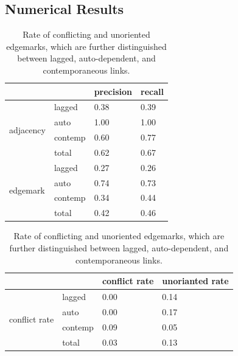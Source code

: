 \documentclass[conference]{IEEEtran}
\begin{document}
\subsection{Numerical Results}
\begin{table}[!htb]
    \caption{Numerical results}
    \begin{minipage}{.5\linewidth}
        \caption[]{precision and recall of edgemarks and adjacencies, which are further distinguished between lagged, auto-dependent, and contemporaneous links.}
      \centering
        \begin{tabular}{@{}llll@{}}
            \toprule
            \textbf{}                  &         & precision      & recall  \\ \midrule
            \multirow{4}{*}{adjacency} & lagged  & 0.38             & 0.39       \\
                                       & auto    & 1.00             & 1.00       \\
                                       & contemp & 0.60             & 0.77       \\
                                       & total   & 0.62             & 0.67       \\ \midrule
            \multirow{4}{*}{edgemark}  & lagged  & 0.27             & 0.26        \\
                                       & auto    & 0.74             & 0.73       \\
                                       & contemp & 0.34             & 0.44       \\
                                       & total   & 0.42             & 0.46       \\ \bottomrule
            \end{tabular}
            \label{tab:precision_recall}
    \end{minipage}%
    \begin{minipage}{.5\linewidth}
      \centering
            \caption[]{Rate of conflicting and unoriented edgemarks, which are further distinguished between lagged, auto-dependent, and contemporaneous links.}
            \begin{tabular}{@{}llll@{}}
            \toprule
            \textbf{}                        &         & conflict rate    & unorianted rate  \\ \midrule
            \multirow{4}{*}{conflict rate}   & lagged  & 0.00               & 0.14                \\
                                             & auto    & 0.00               & 0.17                \\
                                             & contemp & 0.09               & 0.05                \\
                                             & total   & 0.03               & 0.13       \\ \bottomrule
            \end{tabular}
            \label{tab:conflict_unoriented}
    \end{minipage} 
\end{table}
\end{document}
